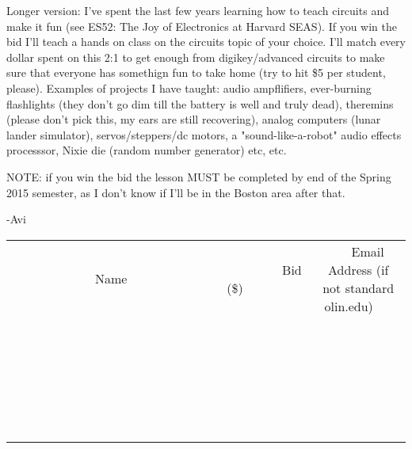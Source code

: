 \documentclass[11pt]{article}
\begin{document}
Longer version:  I've spent the last few years learning how to teach circuits and make it fun (see ES52: The Joy of Electronics at Harvard SEAS).  If you win the bid I'll teach a hands on class on the circuits topic of your choice.  I'll match every dollar spent on this 2:1 to get enough from digikey/advanced circuits to make sure that everyone has somethign fun to take home (try to hit \$5 per student, please).  Examples of projects I have taught: audio ampflifiers, ever-burning flashlights (they don't go dim till the battery is well and truly dead), theremins (please don't pick this, my ears are still recovering), analog computers (lunar lander simulator), servos/steppers/dc motors, a "sound-like-a-robot" audio effects processsor, Nixie die (random number generator) etc, etc.  

NOTE: if you win the bid the lesson MUST be completed by end of the Spring 2015 semester, as I don't know if I'll be in the Boston area after that.

-Avi
\\[6ex]
\begin{tabular}{c c c}
~~~~~~~~~~~~~Name~~~~~~~~~~~~~ & ~~~~~~~~~Bid (\$)~~~~~~~~~  & ~~~Email Address (if not standard olin.edu)~~~\\
 & & \\
\hline
 & & \\
\hline
 & & \\
\hline
 & & \\
\hline
 & & \\
\hline
 & & \\
\hline
 & & \\
\hline
 & & \\
\hline
 & & \\
\hline
 & & \\
\hline
 & & \\
\hline
 & & \\
\hline
 & & \\
\hline
 & & \\
\hline
 & & \\
\hline
 & & \\
\hline
 & & \\
\hline
 & & \\
\hline
 & & \\
\hline
 & & \\
\hline
 & & \\
\hline
 & & \\
\hline
 & & \\
\hline
 & & \\
\hline
 & & \\
\hline
 & & \\
\hline
\end{tabular}
\newpage
\end{document}
